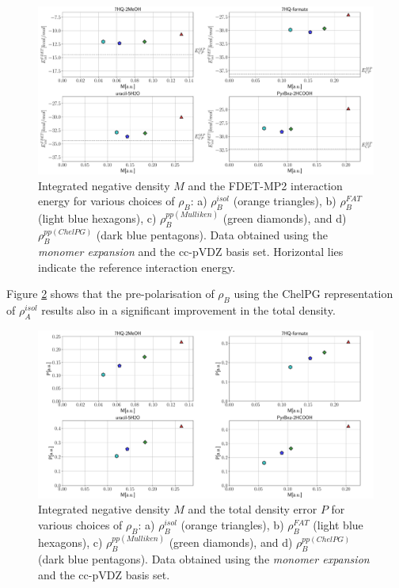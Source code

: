 \documentclass[amsmath,amssymb,preprint,aip,jcp]{revtex4-1}
\begin{document}
\begin{figure}
\centering
\includegraphics[width=1.0\linewidth]{M_vs_MP_ccpVDZ.pdf}
\caption{Integrated negative density $M$ and the FDET-MP2 interaction energy for various choices of $\rho_B$: a) $\rho_B^{isol}$ (orange triangles), b) $\rho_B^{FAT}$ (light blue hexagons), c) $\rho_B^{pp(Mulliken)}$ (green diamonds), and d) $\rho_B^{pp(ChelPG)}$ (dark blue pentagons). Data obtained using the {\it monomer expansion} and the cc-pVDZ basis set. Horizontal lies indicate the reference interaction energy.}
\label{fig:M_vs_MP}
\end{figure}

Figure \ref{fig:M_vs_P} shows that the pre-polarisation of $\rho_B$ using the ChelPG representation of $\rho_A^{isol}$
results also in a significant improvement in the total density.
\begin{figure}
\centering
\includegraphics[width=1.0\linewidth]{M_vs_P_ccpVDZ.pdf}
\caption{Integrated negative density $M$ and the total density error $P$ for various choices of $\rho_B$: a) $\rho_B^{isol}$ (orange triangles), b) $\rho_B^{FAT}$ (light blue hexagons), c) $\rho_B^{pp(Mulliken)}$ (green diamonds), and d) $\rho_B^{pp(ChelPG)}$ (dark blue pentagons). Data obtained using the {\it monomer expansion} and the cc-pVDZ basis set.}
\label{fig:M_vs_P}
\end{figure}
\end{document}
